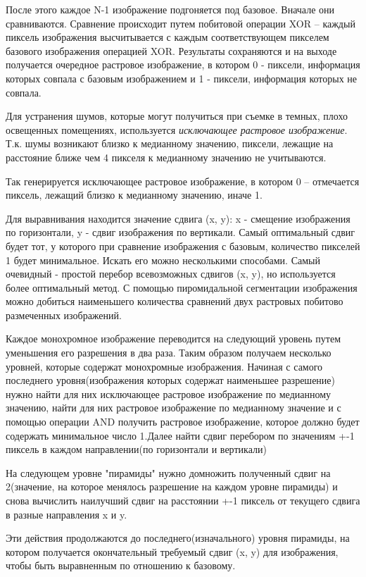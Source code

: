     После этого каждое N-1 изображение подгоняется под базовое. Вначале они сравниваются. Сравнение происходит путем побитовой операции XOR -- каждый пиксель изображения высчитывается с каждым соответствующем пикселем базового изображения операцией XOR. Результаты сохраняются и на выходе получается очередное растровое изображение, в котором 0 - пиксели, информация которых совпала с базовым изображением и 1 - пиксели, информация которых не совпала.

Для устранения шумов, которые могут получиться при съемке в темных, плохо освещенных помещениях, используется \textit{исключающее растровое изображение}. Т.к. шумы возникают близко к медианному значению, пиксели, лежащие на расстояние ближе чем 4 пикселя к медианному значению не учитываются. 

Так генерируется исключающее растровое изображение, в котором 0 -- отмечается пиксель, лежащий близко к медианному значению, иначе 1.

    Для выравнивания находится значение сдвига (x, y): x - смещение изображения по горизонтали, y - сдвиг изображения по вертикали.
Самый оптимальный сдвиг будет тот, у которого при сравнение изображения с базовым, количество пикселей 1 будет минимальное. Искать его можно несколькими способами. Самый очевидный - простой перебор всевозможных сдвигов (x, y), но используется более оптимальный метод. С помощью пиромидальной сегментации изображения можно добиться наименьшего количества сравнений двух растровых побитово размеченных изображений.

Каждое монохромное изображение переводится на следующий уровень путем уменьшения его разрешения в два раза. Таким образом получаем несколько уровней, которые содержат монохромные изображения. Начиная с самого последнего уровня(изображения которых содержат наименьшее разрешение) нужно найти для них исключающее растровое изображение по медианному значению, найти для них растровое изображение по медианному значение и с помощью операции AND получить растровое изображение, которое должно будет содержать минимальное число 1.Далее найти сдвиг перебором по значениям +-1 пиксель в каждом направлении(по горизонтали и вертикали)

На следующем уровне "пирамиды" нужно домножить полученный сдвиг на 2(значение, на которое менялось разрешение на каждом уровне пирамиды) и снова вычислить наилучший сдвиг на расстоянии +-1 пиксель от текущего сдвига в разные направления x и y.

Эти действия продолжаются до последнего(изначального) уровня пирамиды, на котором получается окончательный требуемый сдвиг (x, y) для изображения, чтобы быть выравненным по отношению к базовому.

